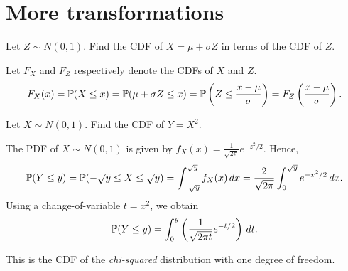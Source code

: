 
\section{More transformations}\label{sec:more_transfs}

\begin{example}
Let $Z\sim N(0,1)$. Find the CDF of $X=\mu+\sigma Z$ in terms of the CDF of $Z$.
\end{example}
\begin{solution}
Let $F_X$ and $F_Z$ respectively denote the CDFs of $X$ and $Z$.
\[
F_X(x)
	= \mathbb{P}(X\leq x)
	= \mathbb{P}(\mu+\sigma Z\leq x)
	= \mathbb{P}\left(Z\leq\frac{x-\mu}{\sigma}\right)
	= F_Z\left(\frac{x-\mu}{\sigma}\right).
\]
\end{solution}

\begin{example}
Let $X\sim N(0,1)$. Find the CDF of $Y=X^2$.
\end{example}
\begin{solution}
The PDF of $X\sim N(0,1)$ is given by $f_X(x) = \displaystyle\frac{1}{\sqrt{2\pi}}e^{-z^2/2}$. Hence,
\[
\mathbb{P}(Y\leq y) 
	= \mathbb{P}(-\sqrt{y}\leq X\leq \sqrt{y})
	= \int_{-\sqrt{y}}^{\sqrt{y}} f_X(x)\,dx
	= \frac{2}{\sqrt{2\pi}}\int_0^{\sqrt{y}} e^{-x^2/2}\,dx.
\]
Using a change-of-variable $t=x^2$, we obtain
\[
\mathbb{P}(Y\leq y) 
	= \int_0^{y} \left(\frac{1}{\sqrt{2\pi t}} e^{-t/2}\right)\,dt.
\]

This is the CDF of the \emph{chi-squared} distribution with one degree of freedom.
\end{solution}


